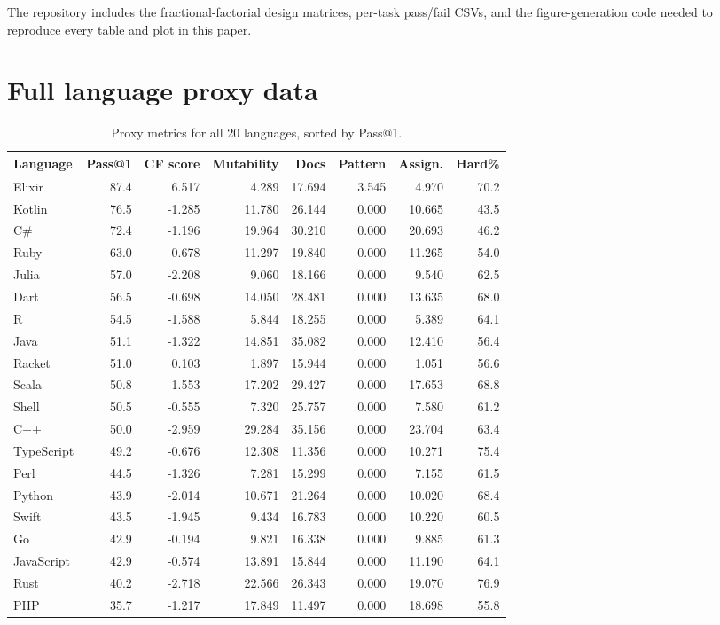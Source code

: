 \documentclass[11pt]{article}
\makeatletter
\newcommand{\passatone}{Pass@1}
\makeatother
\begin{document}
\noindent The repository includes the fractional-factorial design matrices, per-task pass/fail CSVs, and the figure-generation code needed to reproduce every table and plot in this paper.

\clearpage
\appendix

\section{Full language proxy data}
\label{app:proxy}

\begin{table}[H]
\centering
\caption{Proxy metrics for all 20 languages, sorted by \passatone{}.}
\label{tab:proxyfull}
\small
\begin{tabular}{lrrrrrrr}
\toprule
Language & \passatone{} & CF score & Mutability & Docs & Pattern & Assign. & Hard\% \\
\midrule
Elixir & 87.4 & 6.517 & 4.289 & 17.694 & 3.545 & 4.970 & 70.2 \\
Kotlin & 76.5 & -1.285 & 11.780 & 26.144 & 0.000 & 10.665 & 43.5 \\
C\# & 72.4 & -1.196 & 19.964 & 30.210 & 0.000 & 20.693 & 46.2 \\
Ruby & 63.0 & -0.678 & 11.297 & 19.840 & 0.000 & 11.265 & 54.0 \\
Julia & 57.0 & -2.208 & 9.060 & 18.166 & 0.000 & 9.540 & 62.5 \\
Dart & 56.5 & -0.698 & 14.050 & 28.481 & 0.000 & 13.635 & 68.0 \\
R & 54.5 & -1.588 & 5.844 & 18.255 & 0.000 & 5.389 & 64.1 \\
Java & 51.1 & -1.322 & 14.851 & 35.082 & 0.000 & 12.410 & 56.4 \\
Racket & 51.0 & 0.103 & 1.897 & 15.944 & 0.000 & 1.051 & 56.6 \\
Scala & 50.8 & 1.553 & 17.202 & 29.427 & 0.000 & 17.653 & 68.8 \\
Shell & 50.5 & -0.555 & 7.320 & 25.757 & 0.000 & 7.580 & 61.2 \\
C++ & 50.0 & -2.959 & 29.284 & 35.156 & 0.000 & 23.704 & 63.4 \\
TypeScript & 49.2 & -0.676 & 12.308 & 11.356 & 0.000 & 10.271 & 75.4 \\
Perl & 44.5 & -1.326 & 7.281 & 15.299 & 0.000 & 7.155 & 61.5 \\
Python & 43.9 & -2.014 & 10.671 & 21.264 & 0.000 & 10.020 & 68.4 \\
Swift & 43.5 & -1.945 & 9.434 & 16.783 & 0.000 & 10.220 & 60.5 \\
Go & 42.9 & -0.194 & 9.821 & 16.338 & 0.000 & 9.885 & 61.3 \\
JavaScript & 42.9 & -0.574 & 13.891 & 15.844 & 0.000 & 11.190 & 64.1 \\
Rust & 40.2 & -2.718 & 22.566 & 26.343 & 0.000 & 19.070 & 76.9 \\
PHP & 35.7 & -1.217 & 17.849 & 11.497 & 0.000 & 18.698 & 55.8 \\
\bottomrule
\end{tabular}
\end{table}
\end{document}
